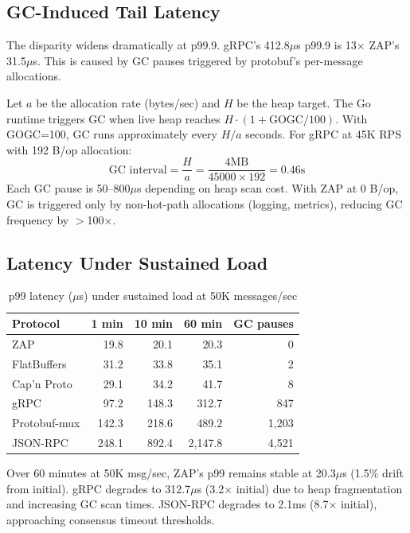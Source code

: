 \subsection{GC-Induced Tail Latency}

The disparity widens dramatically at p99.9. gRPC's 412.8$\mu$s p99.9 is 13$\times$ ZAP's 31.5$\mu$s. This is caused by GC pauses triggered by protobuf's per-message allocations.

\begin{lemma}
\label{lem:gc}
Let $a$ be the allocation rate (bytes/sec) and $H$ be the heap target. The Go runtime triggers GC when live heap reaches $H \cdot (1 + \text{GOGC}/100)$. With GOGC=100, GC runs approximately every $H/a$ seconds. For gRPC at 45K RPS with 192 B/op allocation:
\[
\text{GC interval} = \frac{H}{a} = \frac{4\text{MB}}{45000 \times 192} = 0.46\text{s}
\]
Each GC pause is 50--800$\mu$s depending on heap scan cost. With ZAP at 0 B/op, GC is triggered only by non-hot-path allocations (logging, metrics), reducing GC frequency by $>$100$\times$.
\end{lemma}

\subsection{Latency Under Sustained Load}

\begin{table}[h]
\centering
\caption{p99 latency ($\mu$s) under sustained load at 50K messages/sec}
\label{tab:latency-load}
\begin{tabular}{lrrrr}
\toprule
\textbf{Protocol} & \textbf{1 min} & \textbf{10 min} & \textbf{60 min} & \textbf{GC pauses} \\
\midrule
\rowcolor{luxblue!10}
ZAP & 19.8 & 20.1 & 20.3 & 0 \\
FlatBuffers & 31.2 & 33.8 & 35.1 & 2 \\
Cap'n Proto & 29.1 & 34.2 & 41.7 & 8 \\
gRPC & 97.2 & 148.3 & 312.7 & 847 \\
Protobuf-mux & 142.3 & 218.6 & 489.2 & 1,203 \\
JSON-RPC & 248.1 & 892.4 & 2,147.8 & 4,521 \\
\bottomrule
\end{tabular}
\end{table}

Over 60 minutes at 50K msg/sec, ZAP's p99 remains stable at 20.3$\mu$s (1.5\% drift from initial). gRPC degrades to 312.7$\mu$s (3.2$\times$ initial) due to heap fragmentation and increasing GC scan times. JSON-RPC degrades to 2.1ms (8.7$\times$ initial), approaching consensus timeout thresholds.

